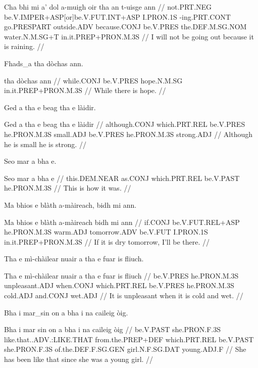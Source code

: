 \documentclass[a4paper,10pt]{article}
\begin{document}
\vspace{4mm}
\gla Cha bhi mi a' dol a-muigh oir tha an t-uisge ann  //
\glb not.PRT.NEG be.V.IMPER+ASP[or]be.V.FUT.INT+ASP I.PRON.1S -ing.PRT.CONT go.PRESPART outside.ADV because.CONJ be.V.PRES the.DEF.M.SG.NOM water.N.M.SG+T in.it.PREP+PRON.M.3S  //
\glft I will not be going out because it is raining. //
\endgl
\xe

\ex
\begingl
\glpre Fhads\_a tha dòchas ann. 

\vspace{4mm}
 tha dòchas ann  //
\glb while.CONJ be.V.PRES hope.N.M.SG in.it.PREP+PRON.M.3S  //
\glft While there is hope. //
\endgl
\xe

\ex
\begingl
\glpre Ged a tha e beag tha e làidir. 

\vspace{4mm}
\gla Ged a tha e beag tha e làidir  //
\glb although.CONJ which.PRT.REL be.V.PRES he.PRON.M.3S small.ADJ be.V.PRES he.PRON.M.3S strong.ADJ  //
\glft Although he is small he is strong. //
\endgl
\xe

\ex
\begingl
\glpre Seo mar a bha e. 

\vspace{4mm}
\gla Seo mar a bha e  //
\glb this.DEM.NEAR as.CONJ which.PRT.REL be.V.PAST he.PRON.M.3S  //
\glft This is how it was. //
\endgl
\xe

\ex
\begingl
\glpre Ma bhios e blàth a-màireach, bidh mi ann. 

\vspace{4mm}
\gla Ma bhios e blàth a-màireach bidh mi ann  //
\glb if.CONJ be.V.FUT.REL+ASP he.PRON.M.3S warm.ADJ tomorrow.ADV be.V.FUT I.PRON.1S in.it.PREP+PRON.M.3S  //
\glft If it is dry tomorrow, I'll be there. //
\endgl
\xe

\ex
\begingl
\glpre Tha e mì-chàilear nuair a tha e fuar is fliuch. 

\vspace{4mm}
\gla Tha e mì-chàilear nuair a tha e fuar is fliuch  //
\glb be.V.PRES he.PRON.M.3S unpleasant.ADJ when.CONJ which.PRT.REL be.V.PRES he.PRON.M.3S cold.ADJ and.CONJ wet.ADJ  //
\glft It is unpleasant when it is cold and wet. //
\endgl
\xe

\ex
\begingl
\glpre Bha i mar\_sin on a bha i na caileig òig. 

\vspace{4mm}
\gla Bha i {mar sin} on a bha i na caileig òig  //
\glb be.V.PAST she.PRON.F.3S like.that..ADV.:LIKE.THAT from.the.PREP+DEF which.PRT.REL be.V.PAST she.PRON.F.3S of.the.DEF.F.SG.GEN girl.N.F.SG.DAT young.ADJ.F  //
\glft She has been like that since she was a young girl. //
\endgl
\xe
\end{document}
